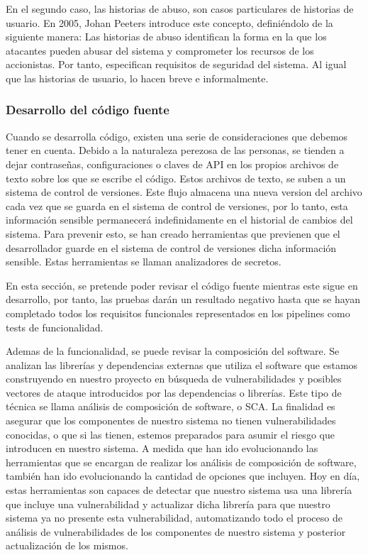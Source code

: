 \documentclass[12pt]{report} %
\begin{document}
En el segundo caso, las historias de abuso, son casos particulares de historias
de usuario.  En 2005, Johan Peeters introduce este concepto, definiéndolo de la
siguiente manera: Las historias de abuso identifican la forma en la que los
atacantes pueden abusar del sistema y comprometer los recursos de los
accionistas.  Por tanto, especifican requisitos de seguridad del sistema.  Al
igual que las historias de usuario, lo hacen breve e informalmente.
\cite{Peeters2005}

\subsubsection{Desarrollo del código fuente}
 
Cuando se desarrolla código, existen una serie de consideraciones que debemos
tener en cuenta.  Debido a la naturaleza perezosa de las personas, se tienden a
dejar contraseñas, configuraciones o claves de \gls{API} en los propios archivos
de texto sobre los que se escribe el código.  Estos archivos de texto, se suben
a un sistema de control de versiones.  Este flujo almacena una nueva version del
archivo cada vez que se guarda en el sistema de control de versiones, por lo
tanto, esta información sensible permanecerá indefinidamente en el historial de
cambios del sistema.  Para prevenir esto, se han creado herramientas que
previenen que el desarrollador guarde en el sistema de control de versiones
dicha información sensible.  Estas herramientas se llaman analizadores de
secretos.

En esta sección, se pretende poder revisar el código fuente mientras este sigue
en desarrollo, por tanto, las pruebas darán un resultado negativo hasta que se
hayan completado todos los requisitos funcionales representados en los pipelines
como tests de funcionalidad.

Ademas de la funcionalidad, se puede revisar la composición del software.  Se
analizan las librerías y dependencias externas que utiliza el software que
estamos construyendo en nuestro proyecto en búsqueda de vulnerabilidades y
posibles vectores de ataque introducidos por las dependencias o librerías.  Este
tipo de técnica se llama análisis de composición de software, o \gls{SCA}.  La
finalidad es asegurar que los componentes de nuestro sistema no tienen
vulnerabilidades conocidas, o que si las tienen, estemos preparados para asumir
el riesgo que introducen en nuestro sistema.  A medida que han ido evolucionando
las herramientas que se encargan de realizar los análisis de composición de
software, también han ido evolucionando la cantidad de opciones que incluyen.
Hoy en día, estas herramientas son capaces de detectar que nuestro sistema usa
una librería que incluye una vulnerabilidad y actualizar dicha librería para que
nuestro sistema ya no presente esta vulnerabilidad, automatizando todo el
proceso de análisis de vulnerabilidades de los componentes de nuestro sistema y
posterior actualización de los mismos.
\end{document}
